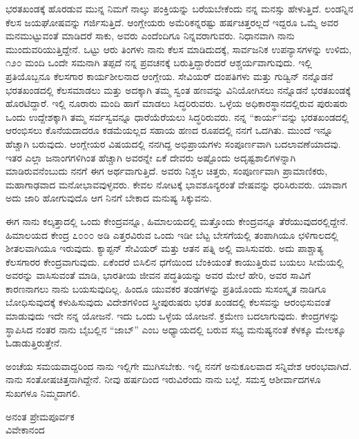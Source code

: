ಭರತಖಂಡಕ್ಕೆ ಹೊರಡುವ ಮುನ್ನ ನಿಮಗೆ ನಾಲ್ಕು ಪಂಕ್ತಿಯನ್ನು ಬರೆಯಬೇಕೆಂದು ನನ್ನ ಮನಸ್ಸು ಹೇಳುತ್ತಿದೆ. ಲಂಡನ್ನಿನ ಕೆಲಸ ಜಯಘೋಷವನ್ನು ಗರ್ಜಿಸುತ್ತಿದೆ. ಆಂಗ್ಲೇಯರು ಅಮೆರಿಕನ್ನರಷ್ಟು ಹರ್ಷಚಿತ್ತರಲ್ಲದೆ ಇದ್ದರೂ ಒಮ್ಮೆ ಅವರ ಮನಮುಟ್ಟುವಂತೆ ಮಾಡಿದರೆ ಸಾಕು, ಅವರು ಎಂದೆಂದಿಗೂ ನಿನ್ನವರಾಗುವರು. ನಿಧಾನವಾಗಿ ನಾನು ಮುಂದುವರಿಯುತ್ತಿದ್ದೇನೆ. ಒಟ್ಟು ಆರು ತಿಂಗಳು ನಾನು ಕೆಲಸ ಮಾಡಿದುದಕ್ಕೆ, ಸಾರ್ವಜನಿಕ ಉಪನ್ಯಾಸಗಳನ್ನು ಉಳಿದು, ೧೨೦ ಮಂದಿ ಒಂದೇ ಸಮನಾಗಿ ತಪ್ಪದೆ ನನ್ನ ಪ್ರವಚನಕ್ಕೆ ಬರುತ್ತಿದ್ದಾರೆಂದರೆ ಆಶ್ಚರ್ಯವಾಗುವುದು. ಇಲ್ಲಿ ಪ್ರತಿಯೊಬ್ಬನೂ ಕೆಲಸಗಾರ\enginline{-} ಕಾರ್ಯಶೀಲನಾದ ಆಂಗ್ಲೇಯ. ಸೇವಿಯರ್ ದಂಪತಿಗಳು ಮತ್ತು ಗುಡ್ವಿನ್ ನನ್ನೊಡನೆ ಭರತಖಂಡದಲ್ಲಿ ಕೆಲಸಮಾಡಲು ಮತ್ತು ಅದಕ್ಕಾಗಿ ತಮ್ಮ ಸ್ವಂತ ಹಣವನ್ನು ವಿನಿಯೋಗಿಸಲು ನನ್ನೊಡನೆ ಭರತಖಂಡಕ್ಕೆ ಹೊರಟಿದ್ದಾರೆ. ಇಲ್ಲಿ ನೂರಾರು ಮಂದಿ ಹಾಗೆ ಮಾಡಲು ಸಿದ್ಧರಿರುವರು. ಒಳ್ಳೆಯ ಅಧಿಕಾರಸ್ಥಾನದಲ್ಲಿರುವ ಪುರುಷರು ಒಂದು ಉದ್ದೇಶಕ್ಕಾಗಿ ತಮ್ಮ ಸರ್ವಸ್ವವನ್ನೂ ಧಾರೆಯೆರೆಯಲು ಸಿದ್ಧರಿರುವರು. ನನ್ನ “ಕಾರ್ಯ“ವನ್ನು ಭರತಖಂಡದಲ್ಲಿ ಆರಂಭಿಸಲು ಕೊನೆಯದಾದರೂ ಕಡಮೆಯಲ್ಲದ ಸಹಾಯ ಹಣದ ರೂಪದಲ್ಲಿ ನನಗೆ ಒದಗಿತು. ಮುಂದೆ ಇನ್ನೂ ಹೆಚ್ಚಾಗಿ ಬರುವುದು. ಆಂಗ್ಲೇಯರ ವಿಷಯದಲ್ಲಿ ನನಗಿದ್ದ ಅಭಿಪ್ರಾಯಗಳು ಸಂಪೂರ್ಣವಾಗಿ ಬದಲಾವಣೆಯಾದವು. ಇತರ ಎಲ್ಲಾ ಜನಾಂಗಗಳಿಗಿಂತ ಹೆಚ್ಚಾಗಿ ಅವರನ್ನೇ ಏಕೆ ದೇವರು ಅಷ್ಟೊಂದು ಅದೃಷ್ಟಶಾಲಿಗಳನ್ನಾಗಿ ಮಾಡಿರುವನೆಂಬುದು ನನಗೆ ಈಗ ಅರ್ಥವಾಗುತ್ತಿದೆ. ಅವರು ನಿಶ್ಚಲ ಚಿತ್ತರು, ಸಂಪೂರ್ಣವಾಗಿ ಪ್ರಾಮಾಣಿಕರು, ಮಹಾಗಾಢವಾದ ಮನೋಭಾವವುಳ್ಳವರು. ಕೇವಲ ನೋಟಕ್ಕೆ ಭಾವಶೂನ್ಯರಂತೆ ವೇಷವನ್ನು ಧರಿಸಿರುವರು. ಯಾವಾಗ ಅದು ಜಾರಿ ಹೋಗುವುದೊ ಆಗ ನಿನಗೆ ಬೇಕಾದ ಮನುಷ್ಯ ಸಿಕ್ಕುವನು.

ಈಗ ನಾನು ಕಲ್ಕತ್ತಾದಲ್ಲಿ ಒಂದು ಕೇಂದ್ರವನ್ನೂ, ಹಿಮಾಲಯದಲ್ಲಿ ಮತ್ತೊಂದು ಕೇಂದ್ರವನ್ನೂ ತೆರೆಯುವುದರಲ್ಲಿದ್ದೇನೆ. ಹಿಮಾಲಯದ ಕೇಂದ್ರ ೭೦೦೦ ಅಡಿ ಎತ್ತರವಿರುವ ಒಂದು ಇಡೀ ಬೆಟ್ಟ\enginline{-} ಬೇಸಗೆಯಲ್ಲಿ ತಂಪಾಗಿಯೂ ಛಳಿಗಾಲದಲ್ಲಿ ಶೀತಲವಾಗಿಯೂ ಇರುವುದು. ಕ್ಯಾಪ್ಟನ್ ಸೇವಿಯರ್ ಮತ್ತು ಆತನ ಪತ್ನಿ ಅಲ್ಲಿ ವಾಸಿಸುವರು. ಅದು ಪಾಶ್ಚಾತ್ಯ ಕೆಲಸಗಾರರ ಕೇಂದ್ರವಾಗುವುದು. ಏಕೆಂದರೆ ಬಿಸಿಲಿನ ಧಗೆಯಿಂದ ಬೆಂಕಿಯಂತೆ ಕಾಯುತ್ತಿರುವ ಬಯಲು ಸೀಮೆಯಲ್ಲಿ ಅವರನ್ನು ವಾಸಿಸುವಂತೆ ಮಾಡಿ, ಭಾರತೀಯ ಜೀವನ ಪದ್ಧತಿಯನ್ನು ಅವರ ಮೇಲೆ ಹೇರಿ, ಅವರ ಸಾವಿಗೆ ಕಾರಣನಾಗಲು ನಾನು ಬಯಸುವುದಿಲ್ಲ. ಹಿಂದೂ ಯುವಕರ ತಂಡಗಳನ್ನು ಪ್ರತಿಯೊಂದು ಸುಸಂಸ್ಕೃತ ನಾಡಿಗೂ ಬೋಧಿಸುವುದಕ್ಕೆ ಕಳುಹಿಸುವುದು\enginline{-} ವಿದೇಶಗಳಿಂದ ಸ್ತ್ರೀಪುರುಷರು ಭರತ ಖಂಡದಲ್ಲಿ ಕೆಲಸವನ್ನು ಆರಂಭಿಸುವಂತೆ ಮಾಡುವುದು\enginline{-} ಇದೇ ನನ್ನ ಯೋಜನೆ. ಇದು ಒಂದು ಒಳ್ಳೆಯ ಯೋಜನೆ. ಕ್ರಮೇಣ ಬದಲಾಗುವುದು. ಕೇಂದ್ರಗಳನ್ನು ಸ್ಥಾಪಿಸಿದ ನಂತರ ನಾನು ಬೈಬಲ್ಲಿನ “ಜಾಬ್” ಎಂಬ ಅಧ್ಯಾಯದಲ್ಲಿ ಬರುವ ಸಭ್ಯ ಮನುಷ್ಯನಂತೆ ಕೆಳಕ್ಕೂ ಮೇಲಕ್ಕೂ ಓಡಾಡುತ್ತಿರುತ್ತೇನೆ.

\vspace{0.15cm}

ಅಂಚೆಯ ಸಮಯವಾದ್ದರಿಂದ ನಾನು ಇಲ್ಲಿಗೇ ಮುಗಿಸಬೇಕು. ಇಲ್ಲಿ ನನಗೆ ಅನುಕೂಲವಾದ ಸನ್ನಿವೇಶ ಆರಂಭವಾಗಿದೆ. ನಾನು ಸಂತೋಷಚಿತ್ತನಾಗಿದ್ದೇನೆ. ನೀವು ಹರ್ಷದಿಂದ ಇರುವಿರೆಂದು ನಾನು ಬಲ್ಲೆ. ಸಮಸ್ತ ಆಶೀರ್ವಾದಗಳೂ ಸುಖಗಳೂ ನಿಮ್ಮದಾಗಲಿ.

\begin{flushright}
ಅನಂತ ಪ್ರೇಮಪೂರ್ವಕ\\ವಿವೇಕಾನಂದ
\end{flushright}

